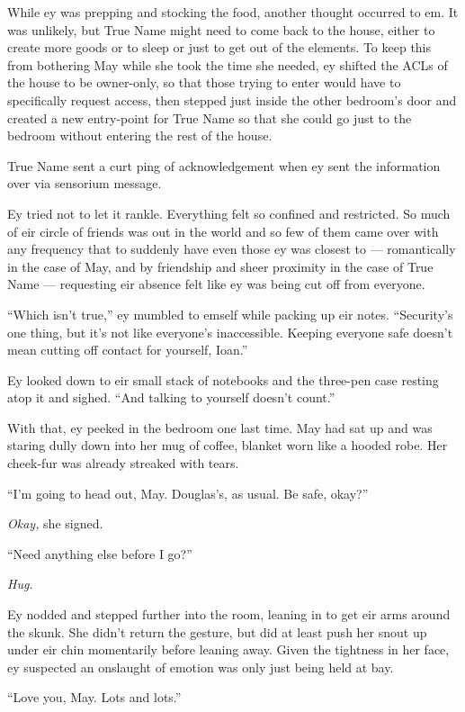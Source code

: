 While ey was prepping and stocking the food, another thought occurred to em. It was unlikely, but True Name might need to come back to the house, either to create more goods or to sleep or just to get out of the elements. To keep this from bothering May while she took the time she needed, ey shifted the ACLs of the house to be owner-only, so that those trying to enter would have to specifically request access, then stepped just inside the other bedroom's door and created a new entry-point for True Name so that she could go just to the bedroom without entering the rest of the house.

True Name sent a curt ping of acknowledgement when ey sent the information over via sensorium message.

Ey tried not to let it rankle. Everything felt so confined and restricted. So much of eir circle of friends was out in the world and so few of them came over with any frequency that to suddenly have even those ey was closest to — romantically in the case of May, and by friendship and sheer proximity in the case of True Name — requesting eir absence felt like ey was being cut off from everyone.

``Which isn't true,'' ey mumbled to emself while packing up eir notes. ``Security's one thing, but it's not like everyone's inaccessible. Keeping everyone safe doesn't mean cutting off contact for yourself, Ioan.''

Ey looked down to eir small stack of notebooks and the three-pen case resting atop it and sighed. ``And talking to yourself doesn't count.''

With that, ey peeked in the bedroom one last time. May had sat up and was staring dully down into her mug of coffee, blanket worn like a hooded robe. Her cheek-fur was already streaked with tears.

``I'm going to head out, May. Douglas's, as usual. Be safe, okay?''

\emph{Okay,} she signed.

``Need anything else before I go?''

\emph{Hug.}

Ey nodded and stepped further into the room, leaning in to get eir arms around the skunk. She didn't return the gesture, but did at least push her snout up under eir chin momentarily before leaning away. Given the tightness in her face, ey suspected an onslaught of emotion was only just being held at bay.

``Love you, May. Lots and lots.''

